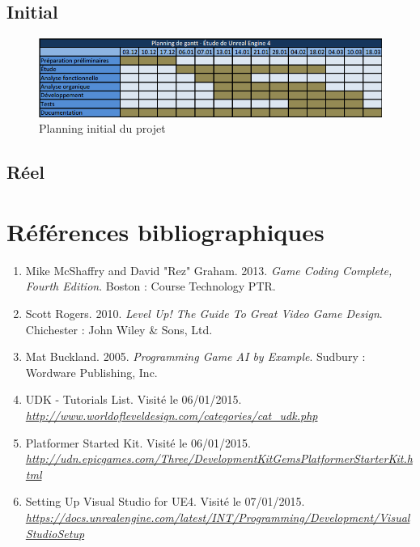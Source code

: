 \documentclass[11pt, a4paper, oneside]{article}
\begin{document}
\subsection{Initial}
\begin{figure}[h]
	\begin{center}
	\includegraphics[scale=.924, angle=90]{planninggantt}
	\caption{Planning initial du projet}
	\label{planningintial}
	\end{center}
\end{figure}
\newpage
\subsection{Réel}
\newpage
\section{Références bibliographiques}
\begin{enumerate}
\item Mike McShaffry and David "Rez" Graham. 2013. \textit{Game Coding Complete, Fourth Edition}. Boston : Course Technology PTR.
\item Scott Rogers. 2010. \textit{Level Up! The Guide To Great Video Game Design}. Chichester : John Wiley \& Sons, Ltd.
\item Mat Buckland. 2005. \textit{Programming Game AI by Example}. Sudbury : Wordware Publishing, Inc.
\item UDK - Tutorials List. Visité le 06/01/2015.\\\textit{\url{http://www.worldofleveldesign.com/categories/cat_udk.php}}
\item Platformer Started Kit.  Visité le 06/01/2015.\\\textit{\url{http://udn.epicgames.com/Three/DevelopmentKitGemsPlatformerStarterKit.html}}
\item Setting Up Visual Studio for UE4. Visité le 07/01/2015.\\\textit{\url{https://docs.unrealengine.com/latest/INT/Programming/Development/VisualStudioSetup}}
\end{enumerate}
\newpage
\listoffigures
\newpage
\listoftables
\end{document}
